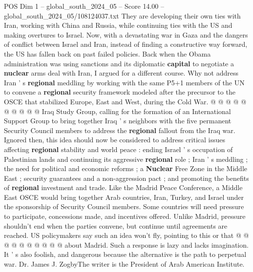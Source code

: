 \begin{textsample}{POS Dim 1 – global\_south\_2024\_05 – Score 14.00 – global\_south\_2024\_05/108124037.txt}
They are developing their own ties with Iran, working with China and Russia, while continuing ties with the US and making overtures to Israel.
Now, with a devastating war in Gaza and the dangers of conflict between Israel and Iran, instead of finding a constructive way forward, the US has fallen back on past failed policies.
Back when the Obama administration was using sanctions and its diplomatic \textbf{capital} to negotiate a \textbf{nuclear} arms deal with Iran, I argued for a different course.
Why not address Iran ' s \textbf{regional} meddling by working with the same P5+1 members of the UN to convene a \textbf{regional} security framework modeled after the precursor to the OSCE that stabilized Europe, East and West, during the Cold War. @ @ @ @ @ @ @ @ @ @ Iraq Study Group, calling for the formation of an International Support Group to bring together Iraq ' s neighbors with the five permanent Security Council members to address the \textbf{regional} fallout from the Iraq war.
Ignored then, this idea should now be considered to address critical issues affecting \textbf{regional} stability and world peace : ending Israel ' s occupation of Palestinian lands and continuing its aggressive \textbf{regional} role ; Iran ' s meddling ; the need for political and economic reforms ; a \textbf{Nuclear} Free Zone in the Middle East ; security guarantees and a non-aggression pact ; and promoting the benefits of \textbf{regional} investment and trade.
Like the Madrid Peace Conference, a Middle East OSCE would bring together Arab countries, Iran, Turkey, and Israel under the sponsorship of Security Council members.
Some countries will need pressure to participate, concessions made, and incentives offered.
Unlike Madrid, pressure shouldn't end when the parties convene, but continue until agreements are reached.
US policymakers say such an idea won't fly, pointing to this or that @ @ @ @ @ @ @ @ @ @ about Madrid.
Such a response is lazy and lacks imagination.
It ' s also foolish, and dangerous because the alternative is the path to perpetual war.
Dr.
James J.
ZogbyThe writer is the President of Arab American Institute.

\end{textsample}
